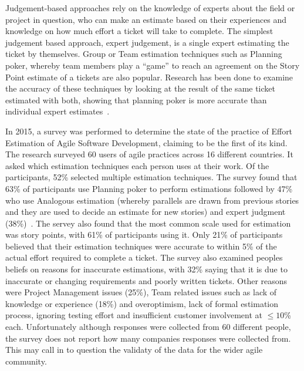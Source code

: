\documentclass{UoYCSproject}
\begin{document}
    Judgement-based approaches rely on the knowledge of experts about the field or project in question, who can make an estimate based on their experiences and knowledge on how much effort a ticket will take to complete.
    The simplest judgement based approach, expert judgement, is a single expert estimating the ticket by themselves.
    Group or Team estimation techniques such as Planning poker, whereby team members play a “game” to reach an agreement on the Story Point estimate of a tickets are also popular.
    Research has been done to examine the accuracy of these techniques by looking at the result of the same ticket estimated with both, showing that planning poker is more accurate than individual expert estimates~\cite{MAHNIC20122086, RashidSCE}. \par
    In 2015, a survey was performed to determine the state of the practice of Effort Estimation of Agile Software Development, claiming to be the first of its kind.
    The research surveyed 60 users of agile practices across 16 different countries.
    It asked which estimation techniques each person uses at their work.
    Of the participants, 52\% selected multiple estimation techniques.
    The survey found that 63\% of participants use Planning poker to perform estimations followed by 47\% who use Analogous estimation (whereby parallels are drawn from previous stories and they are used to decide an estimate for new stories) and expert judgment (38\%)~\cite{effortestimationsurvey}.
    The servey also found that the most common scale used for estimation was story points, with 61\% of participants using it.
    Only 21\% of participants believed that their estimation techniques were accurate to within 5\% of the actual effort required to complete a ticket.
    The survey also examined peoples beliefs on reasons for inaccurate estimations, with 32\% saying that it is due to inaccurate or changing requirements and poorly written tickets.
    Other reasons were Project Management issues (25\%), Team related issues such as lack of knowledge or experience (18\%) and overoptimism, lack of formal estimation process, ignoring testing effort and insufficient customer involvement at $\leq 10$\% each.
    Unfortunately although responses were collected from 60 different people, the survey does not report how many companies responses were collected from. This may call in to question the validaty of the data for the wider agile community. \par
\end{document}
